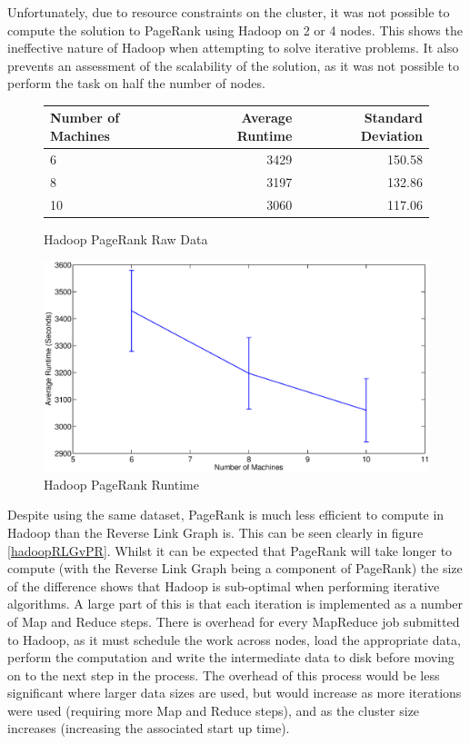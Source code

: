 Unfortunately, due to resource constraints on the cluster, it was not possible to compute the solution to PageRank using Hadoop on 2 or 4 nodes. This shows the ineffective nature of Hadoop when attempting to solve iterative problems. It also prevents an assessment of the scalability of the solution, as it was not possible to perform the task on half the number of nodes.

\begin{figure}[H]
\centering
	\begin{tabular}{lrr}
		\toprule
		Number of Machines & Average Runtime & Standard Deviation \\
		\midrule

		6 & 3429 & 150.58 \\
		8 & 3197 & 132.86 \\
		10 & 3060 & 117.06 \\
		\bottomrule
	\end{tabular}
	\caption{Hadoop PageRank Raw Data}
\end{figure}

\begin{figure}[H]
	\centering
	\includegraphics[scale=0.6]{resources/HadoopPR.eps}
	\caption{Hadoop PageRank Runtime}
\end{figure}

Despite using the same dataset, PageRank is much less efficient to compute in Hadoop than the Reverse Link Graph is. This can be seen clearly in figure \ref{hadoopRLGvPR}. Whilst it can be expected that PageRank will take longer to compute (with the Reverse Link Graph being a component of PageRank) the size of the difference shows that Hadoop is sub-optimal when performing iterative algorithms. A large part of this is that each iteration is implemented as a number of Map and Reduce steps. There is overhead for every MapReduce job submitted to Hadoop, as it must schedule the work across nodes, load the appropriate data, perform the computation and write the intermediate data to disk before moving on to the next step in the process. The overhead of this process would be less significant where larger data sizes are used, but would increase as more iterations were used (requiring more Map and Reduce steps), and as the cluster size increases (increasing the associated start up time). 

